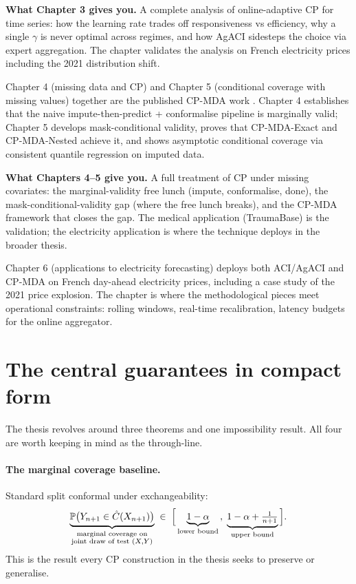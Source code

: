 \documentclass[letterpaper,11pt,leqno]{article}
\begin{document}
\begin{explain}
\textbf{What Chapter 3 gives you.} A complete analysis of online-adaptive CP for time series: how the learning rate trades off responsiveness vs efficiency, why a single $\gamma$ is never optimal across regimes, and how AgACI sidesteps the choice via expert aggregation. The chapter validates the analysis on French electricity prices including the 2021 distribution shift.
\end{explain}

Chapter 4 (missing data and CP) and Chapter 5 (conditional coverage with missing values) together are the published CP-MDA work \cite{zaffran2024missing}. Chapter 4 establishes that the naive impute-then-predict + conformalise pipeline is marginally valid; Chapter 5 develops mask-conditional validity, proves that CP-MDA-Exact and CP-MDA-Nested achieve it, and shows asymptotic conditional coverage via consistent quantile regression on imputed data.

\begin{explain}
\textbf{What Chapters 4--5 give you.} A full treatment of CP under missing covariates: the marginal-validity free lunch (impute, conformalise, done), the mask-conditional-validity gap (where the free lunch breaks), and the CP-MDA framework that closes the gap. The medical application (TraumaBase) is the validation; the electricity application is where the technique deploys in the broader thesis.
\end{explain}

Chapter 6 (applications to electricity forecasting) deploys both ACI/AgACI and CP-MDA on French day-ahead electricity prices, including a case study of the 2021 price explosion. The chapter is where the methodological pieces meet operational constraints: rolling windows, real-time recalibration, latency budgets for the online aggregator.

\section{The central guarantees in compact form}\label{s:guarantees}

The thesis revolves around three theorems and one impossibility result. All four are worth keeping in mind as the through-line.

\paragraph{The marginal coverage baseline.} Standard split conformal under exchangeability:
\begin{equation*}
\underbrace{\mathbb{P}\bigl(Y_{n+1} \in \hat{C}(X_{n+1})\bigr)}_{\substack{\text{marginal coverage on}\\\text{joint draw of test } (X,Y)}}
\;\in\;
\Bigl[\,
\underbrace{1 - \alpha}_{\text{lower bound}}
\,,\;
\underbrace{1 - \alpha + \tfrac{1}{n+1}}_{\text{upper bound}}
\,\Bigr].
\end{equation*}
This is the result every CP construction in the thesis seeks to preserve or generalise.
\end{document}
